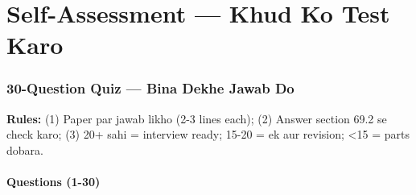 \newpage

\part{Self-Assessment --- Khud Ko Test Karo}

\section{30-Question Quiz --- Bina Dekhe Jawab Do}

\begin{conceptbox}
\textbf{Rules:} (1) Paper par jawab likho (2-3 lines each); (2) Answer section 69.2 se check karo; (3) 20+ sahi = interview ready; 15-20 = ek aur revision; <15 = parts dobara.
\end{conceptbox}

\subsection{Questions (1-30)}

